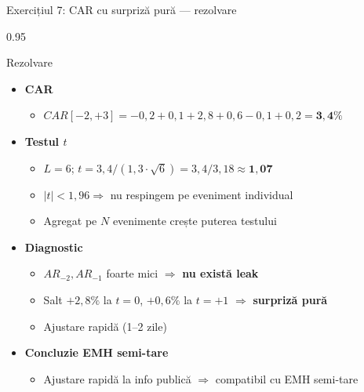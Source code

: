\documentclass[9pt, aspectratio=169, t]{beamer}
\begin{document}
\begin{frame}[shrink=15]{Exercițiul 7: CAR cu surpriză pură --- rezolvare}
\begin{cminipage}{0.95\textwidth}
\begin{exampleblock}{Rezolvare}
\begin{itemize}\setlength{\itemsep}{0pt}
    \item \textbf{CAR}
    \begin{itemize}\setlength{\itemsep}{0pt}
        \item $CAR[-2, +3] = -0{,}2 + 0{,}1 + 2{,}8 + 0{,}6 - 0{,}1 + 0{,}2 = \mathbf{3{,}4\%}$
    \end{itemize}
    \item \textbf{Testul $t$}
    \begin{itemize}\setlength{\itemsep}{0pt}
        \item $L = 6$; $t = 3{,}4/(1{,}3 \cdot \sqrt{6}) = 3{,}4/3{,}18 \approx \mathbf{1{,}07}$
        \item $|t| < 1{,}96 \Rightarrow$ nu respingem pe eveniment individual
        \item Agregat pe $N$ evenimente crește puterea testului
    \end{itemize}
    \item \textbf{Diagnostic}
    \begin{itemize}\setlength{\itemsep}{0pt}
        \item $AR_{-2}, AR_{-1}$ foarte mici $\Rightarrow$ \textbf{nu există leak}
        \item Salt $+2{,}8\%$ la $t=0$, $+0{,}6\%$ la $t=+1$ $\Rightarrow$ \textbf{surpriză pură}
        \item Ajustare rapidă (1--2 zile)
    \end{itemize}
    \item \textbf{Concluzie EMH semi-tare}
    \begin{itemize}\setlength{\itemsep}{0pt}
        \item Ajustare rapidă la info publică $\Rightarrow$ compatibil cu EMH semi-tare
    \end{itemize}
\end{itemize}
\end{exampleblock}
\end{cminipage}
\end{frame}
\end{document}
